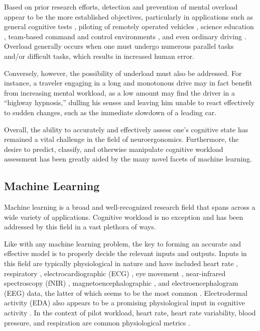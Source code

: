 \documentclass[12pt]{uthesis-v12}  %
\begin{document}
Based on prior research efforts, detection and prevention of mental overload appear to be the more established objectives, particularly in applications such as general cognitive tests \cite{berka}, piloting of remotely operated vehicles \cite{durantin}, science education \cite{niaz}, team-based command and control environments \cite{gfunke}, and even ordinary driving \cite{lenn,reimer,collet}. Overload generally occurs when one must undergo numerous parallel tasks and/or difficult tasks, which results in increased human error. 

Conversely, however, the possibility of underload \cite{dillard} must also be addressed. For instance, a traveler engaging in a long and monotonous drive may in fact benefit from increasing mental workload, as a low amount may find the driver in a ``highway hypnosis,'' dulling his senses and leaving him unable to react effectively to sudden changes, such as the immediate slowdown of a leading car.

Overall, the ability to accurately and effectively assess one's cognitive state has remained a vital challenge in the field of neuroergonomics. Furthermore, the desire to predict, classify, and otherwise manipulate cognitive workload assessment has been greatly aided by the many novel facets of machine learning.

\subsection{Machine Learning}

Machine learning is a broad and well-recognized research field that spans across a wide variety of applications. Cognitive workload is no exception and has been addressed by this field in a vast plethora of ways.

Like with any machine learning problem, the key to forming an accurate and effective model is to properly decide the relevant inputs and outputs. Inputs in this field are typically physiological in nature and have included heart rate \cite{strang,henel}, respiratory \cite{wilson}, electrocardiographic (ECG) \cite{wilson,dussault}, eye movement \cite{halverson}, near-infrared spectroscopy (fNIR) \cite{hincks,cakir}, magnetoencephalographic \cite{kramer}, and electroencephalogram (EEG) \cite{berka,christen2,gfunke2,bashivan} data, the latter of which seems to be the most common \cite{wilson, zheng, bashivan}. Electrodermal activity (EDA) also appears to be a promising physiological input in cognitive activity \cite{natarajan}. In the context of pilot workload, heart rate, heart rate variability, blood pressure, and respiration are common physiological metrics \cite{veltman,roscoe,lee}.
\end{document}

